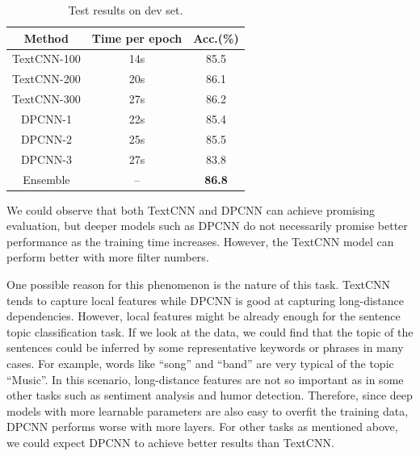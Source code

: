 \documentclass[11pt,letterpaper]{article}
\begin{document}
    \begin{table}[htbp]
        \centering
        \begin{tabular}{ccc}
            \toprule
                {\bf Method}    & {\bf Time per epoch}  & {\bf Acc.(\%)} \\
            \midrule
                TextCNN-100     & 14s                   & 85.5 \\
                TextCNN-200     & 20s                   & 86.1 \\
                TextCNN-300     & 27s                   & 86.2 \\
                DPCNN-1         & 22s                   & 85.4 \\
                DPCNN-2         & 25s                   & 85.5 \\
                DPCNN-3         & 27s                   & 83.8 \\
                Ensemble        & --                    & {\bf 86.8} \\
            \bottomrule
        \end{tabular}
        \caption{\label{tab:primary} Test results on dev set.}
    \end{table}

    We could observe that both TextCNN and DPCNN can achieve promising 
    evaluation, but deeper models such as DPCNN do not necessarily promise
    better performance as the training time increases. However, the TextCNN
    model can perform better with more filter numbers.

    One possible reason for this phenomenon is the nature of this task. TextCNN
    tends to capture local features while DPCNN is good at capturing 
    long-distance dependencies. However, local features might be already enough 
    for the sentence topic classification task. If we look at the data, we could
    find that the topic of the sentences could be inferred by some 
    representative keywords or phrases in many cases. For example, words like 
    ``song'' and ``band'' are very typical of the topic ``Music''. In this 
    scenario, long-distance features are not so important as in some other tasks 
    such as sentiment analysis and humor detection. Therefore, since deep models 
    with more learnable parameters are also easy to overfit the training data, 
    DPCNN performs worse with more layers. For other tasks as mentioned above, 
    we could expect DPCNN to achieve better results than TextCNN.
\end{document}
